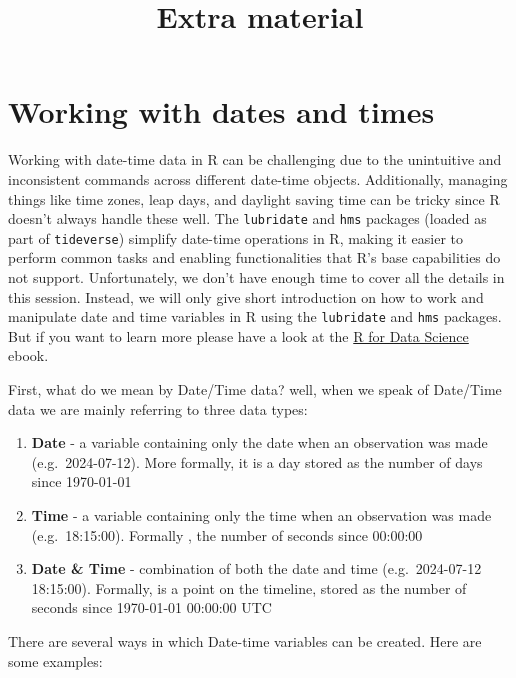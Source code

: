 \documentclass[
  letterpaper,
  DIV=11,
  numbers=noendperiod]{scrartcl}
\title{Extra material}
\author{}
\date{}
\makeatletter
\renewcommand{\maketitle}{\bgroup\setlength{\parindent}{0pt}
\begin{flushleft}
  {\color{uniblue}\sffamily\huge\textbf{\@title}} \vspace{0.3cm} \newline
  {\Large {\@subtitle}} \newline
  \@author
\end{flushleft}\egroup
}
\makeatother
\begin{document}
\maketitle

\pagestyle{mystyle}

\section{Working with dates and
times}\label{working-with-dates-and-times}

Working with date-time data in R can be challenging due to the
unintuitive and inconsistent commands across different date-time
objects. Additionally, managing things like time zones, leap days, and
daylight saving time can be tricky since R doesn't always handle these
well. The \texttt{lubridate} and \texttt{hms} packages (loaded as part
of \texttt{tideverse}) simplify date-time operations in R, making it
easier to perform common tasks and enabling functionalities that R's
base capabilities do not support. Unfortunately, we don't have enough
time to cover all the details in this session. Instead, we will only
give short introduction on how to work and manipulate date and time
variables in R using the \texttt{lubridate} and \texttt{hms} packages.
But if you want to learn more please have a look at the
\href{https://r4ds.hadley.nz/datetimes}{R for Data Science} ebook.

First, what do we mean by Date/Time data? well, when we speak of
Date/Time data we are mainly referring to three data types:

\begin{enumerate}
\def\labelenumi{\arabic{enumi}.}
\item
  \textbf{Date} - a variable containing only the date when an
  observation was made (e.g.~2024-07-12). More formally, it is a day
  stored as the number of days since 1970-01-01
\item
  \textbf{Time} - a variable containing only the time when an
  observation was made (e.g.~18:15:00). Formally , the number of seconds
  since 00:00:00
\item
  \textbf{Date \& Time} - combination of both the date and time
  (e.g.~2024-07-12 18:15:00). Formally, is a point on the timeline,
  stored as the number of seconds since 1970-01-01 00:00:00 UTC
\end{enumerate}

There are several ways in which Date-time variables can be created. Here
are some examples:
\end{document}
